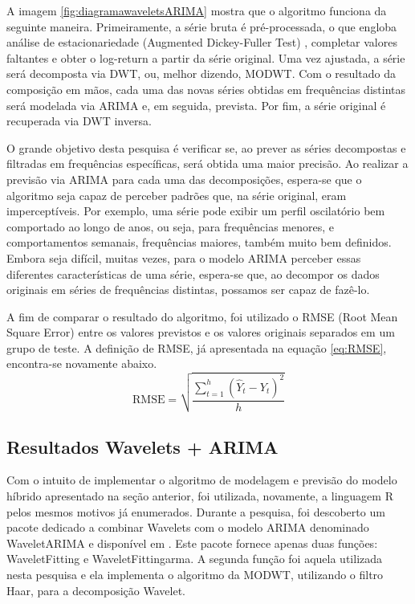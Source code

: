 \documentclass[12pt]{article}
\begin{document}
	A imagem \ref{fig:diagramawaveletsARIMA} mostra que o algoritmo funciona da seguinte maneira. Primeiramente, a série bruta é pré-processada, o que engloba análise de estacionariedade \textrm{(Augmented Dickey-Fuller Test)} \cite{Tsay}, completar valores faltantes e obter o \textrm{log-return} a partir da série original. Uma vez ajustada, a série será decomposta via \textrm{DWT}, ou, melhor dizendo, \textrm{MODWT}. Com o resultado da composição em mãos, cada uma das novas séries obtidas em frequências distintas será modelada via ARIMA e, em seguida, prevista. Por fim, a série original é recuperada via \textrm{DWT} inversa.
	
	O grande objetivo desta pesquisa é verificar se, ao prever as séries decompostas e filtradas em frequências específicas, será obtida uma maior precisão. Ao realizar a previsão via ARIMA para cada uma das decomposições, espera-se que o algoritmo seja capaz de perceber padrões que, na série original, eram imperceptíveis. Por exemplo, uma série pode exibir um perfil oscilatório bem comportado ao longo de anos, ou seja, para frequências menores, e comportamentos semanais, frequências maiores, também muito bem definidos. Embora seja difícil, muitas vezes, para o modelo ARIMA perceber essas diferentes características de uma série, espera-se que, ao decompor os dados originais em séries de frequências distintas, possamos ser capaz de fazê-lo.
	
	A fim de comparar o resultado do algoritmo, foi utilizado o \textrm{RMSE} \textrm{(Root Mean Square Error)} entre os valores previstos e os valores originais separados em um grupo de teste. A definição de \textrm{RMSE}, já apresentada na equação \ref{eq:RMSE}, encontra-se novamente abaixo.
	\begin{equation*}
			\textrm{RMSE} = \sqrt{\dfrac{\sum_{t=1}^{h}(\hat{Y}_t-Y_t)^2}{h}}
	\end{equation*}
	
	\subsection{Resultados Wavelets + ARIMA}\label{sec:resultadosWave}
	
	Com o intuito de implementar o algoritmo de modelagem e previsão do modelo híbrido apresentado na seção anterior, foi utilizada, novamente, a linguagem R pelos mesmos motivos já enumerados. Durante a pesquisa, foi descoberto um pacote dedicado a combinar \textrm{Wavelets} com o modelo ARIMA denominado \textrm{WaveletARIMA} e disponível em \cite{CRANR}. Este pacote fornece apenas duas funções: \textrm{WaveletFitting} e \textrm{WaveletFittingarma}. A segunda função foi aquela utilizada nesta pesquisa e ela implementa o algoritmo da MODWT, utilizando o filtro \textrm{Haar}, para a decomposição \textrm{Wavelet}.
	
\end{document}
